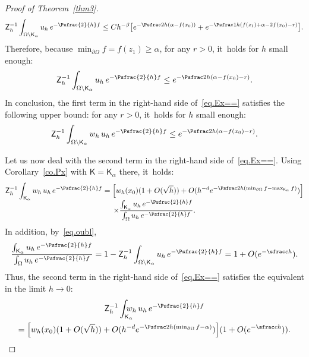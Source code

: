 \begin{proof}[Proof of Theorem~\ref{thm3}]
\[
{\mathsf Z_h^{-1}}\int_{\Omega \setminus \mathsf K_{\alpha}}
{u}_h\, e^{-\Psfrac{2}{h}f}\le Ch^{-\beta} \big [ e^{-\Psfrac 2h (\alpha -f(x_0))}+ e^{-\Psfrac 1h (f(z_1)+\alpha -2f(x_0)-r)} \big].
\]
Therefore, because $\min_{\partial \Omega }f=f(z_1)\ge \alpha$, for any $r>0$, it~holds for $h$ small enough:\vspace*{-3pt}
\begin{equation}\label{eq.oubl}
{\mathsf Z_h^{-1}}\int_{\Omega \setminus \mathsf K_{\alpha}}
{u}_h\, e^{-\Psfrac{2}{h}f}\le e^{-\Psfrac 2h (\alpha -f(x_0)-r)}.
\end{equation}
In conclusion, the first term in the right-hand side of~\eqref{eq.Ex==} satisfies the following upper bound: for any $r>0$, it~holds for $h$ small enough:\vspace*{-3pt}
\begin{equation}\label{eq.Est1-EE2}
{\mathsf Z_h^{-1}} \int_{\Omega \setminus \mathsf K_{\alpha}}w_h\,
{u}_h\, e^{-\Psfrac{2}{h}f} \le e^{-\Psfrac 2h (\alpha -f(x_0)-r)}.
\end{equation}

Let us now deal with the second term in the right-hand side of~\eqref{eq.Ex==}. Using Corollary~\ref{co.Px} with $\mathsf K=\mathsf K_{\alpha}$ there, it~holds:\vspace*{-5pt}
\begin{multline*}
{\mathsf Z_h^{-1}} \int_{\mathsf K_{\alpha}} w_h\, {u}_h\,
e^{-\Psfrac{2}{h}f} = \Big[w_h(x_0)(1+O(\sqrt h))+ O(h^{-d}e^{-\Psfrac
2h (\min_{\partial \Omega }f-\max_{\mathsf K_{\alpha}} f)}) \Big]
\\[-5pt]
\times \frac{\int_{\mathsf K_{\alpha}} {u}_h\, e^{-\Psfrac{2}{h}f}
}{ \int_{\Omega} {u}_h\, e^{-\Psfrac{2}{h}f} }.
\end{multline*}
In addition, by~\eqref{eq.oubl},
\[
\frac{\int_{\mathsf K_{\alpha}} {u}_h\, e^{-\Psfrac{2}{h}f} }{ \int_{\Omega} {u}_h\, e^{-\Psfrac{2}{h}f} }=1- {\mathsf Z_h^{-1}}\int_{\Omega \setminus \mathsf K_{\alpha}}
{u}_h\, e^{-\Psfrac{2}{h}f}=1+O(e^{-\sfrac ch}).
\]
Thus, the second term in the right-hand side of~\eqref{eq.Ex==} satisfies the equivalent in the limit $h\to 0$:
\begin{multline}\label{eq.Est1-EE3}
{\mathsf Z_h^{-1}} \int_{\mathsf K_{\alpha}} \!\!\! \!\!\! w_h\, {u}_h\, e^{-\Psfrac{2}{h}f}\\
= \Big[w_h(x_0)(1+O(\sqrt h))+ O(h^{-d}e^{-\Psfrac 2h (\min_{\partial \Omega }f-\alpha)}) \Big] (1+O(e^{-\sfrac ch})).
\end{multline}


\end{proof}
